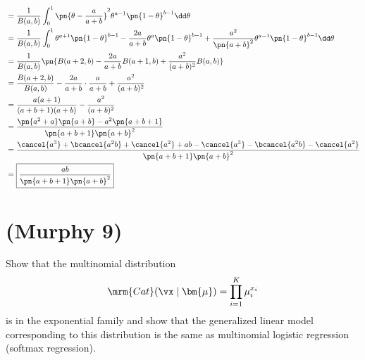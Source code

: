 \documentclass[189]{pset}
\begin{document}
\begin{enumerate}
\begin{align*}
          &= \frac{1}{B(a,b)} \int_0^1 \pn{\theta - \frac{a}{a+b}}^2
            \theta^{a-1} \pn{1-\theta}^{b-1} \dd \theta \\
          &= \frac{1}{B(a,b)} \int_0^1 \theta^{a+1}\pn{1-\theta}^{b-1}
            - \frac{2a}{a+b}\theta^{a}\pn{1-\theta}^{b-1} +
            \frac{a^2}{\pn{a+b}^2} \theta^{a-1}\pn{1-\theta}^{b-1} \dd
            \theta \\
          &= \frac{1}{B(a,b)} \pn{B(a+2,b) - \frac{2a}{a+b}B(a+1,b) +
            \frac{a^2}{(a+b)^2} B(a,b)} \\
          &= \frac{B(a+2,b)}{B(a,b)} - \frac{2a}{a+b} \cdot
            \frac{a}{a+b} + \frac{a^2}{(a+b)^2} \\
          &= \frac{a(a+1)}{(a+b+1)(a+b)} - \frac{a^2}{(a+b)^2} \\
          &= \frac{\pn{a^2+a}\pn{a+b} - a^2\pn{a+b+1}}{\pn{a+b+1}
            \pn{a+b}^2} \\
          &= \frac{\cancel{a^3} + \bcancel{a^2b} + \cancel{a^2} + ab -
            \cancel{a^3} - \bcancel{a^2b} - \cancel{a^2}}{\pn{a+b+1}
            \pn{a+b}^2} \\
          &= \boxed{\frac{ab}{\pn{a+b+1}\pn{a+b}^2}}
        \end{align*}
    \end{enumerate}

  \clearpage


  \section{(Murphy 9)}
    Show that the multinomial distribution
    \[
      \mrm{Cat}(\vx\mid\bm{\mu}) = \prod_{i=1}^K \mu_i^{x_i}
    \]
    is in the exponential family and show that the generalized linear
    model corresponding to this distribution is the same as
    multinomial logistic regression (softmax regression).

  \hrulefill
\end{document}
